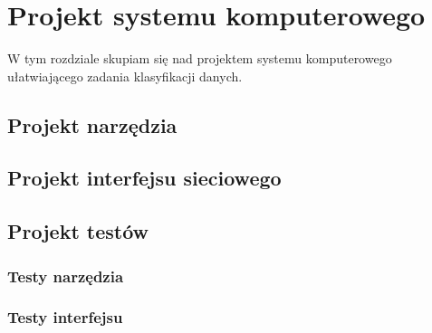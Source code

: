 \documentclass[../thesis.tex]{subfiles}
\begin{document}
\pagestyle{plain}

\chapter{Projekt systemu komputerowego}

W tym rozdziale skupiam się nad projektem systemu komputerowego ułatwiającego zadania klasyfikacji danych. 

\section{Projekt narzędzia}
\section{Projekt interfejsu sieciowego}
\section{Projekt testów}
\subsection{Testy narzędzia}
\subsection{Testy interfejsu}
\end{document}
